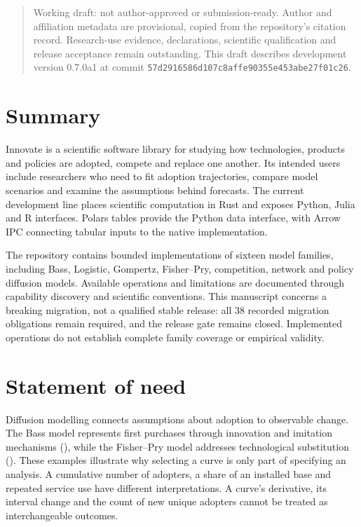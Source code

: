 \documentclass[10pt,a4paper,onecolumn]{article}
\begin{document}
\begin{quote}
Working draft: not author-approved or submission-ready. Author and
affiliation metadata are provisional, copied from the repository's
citation record. Research-use evidence, declarations, scientific
qualification and release acceptance remain outstanding. This draft
describes development version 0.7.0a1 at commit
\texttt{57d2916586d107c8affe90355e453abe27f01c26}.
\end{quote}

\section{Summary}\label{summary}

Innovate is a scientific software library for studying how technologies,
products and policies are adopted, compete and replace one another. Its
intended users include researchers who need to fit adoption
trajectories, compare model scenarios and examine the assumptions behind
forecasts. The current development line places scientific computation in
Rust and exposes Python, Julia and R interfaces. Polars tables provide
the Python data interface, with Arrow IPC connecting tabular inputs to
the native implementation.

The repository contains bounded implementations of sixteen model
families, including Bass, Logistic, Gompertz, Fisher--Pry, competition,
network and policy diffusion models. Available operations and
limitations are documented through capability discovery and scientific
conventions. This manuscript concerns a breaking migration, not a
qualified stable release: all 38 recorded migration obligations remain
required, and the release gate remains closed. Implemented operations do
not establish complete family coverage or empirical validity.

\section{Statement of need}\label{statement-of-need}

Diffusion modelling connects assumptions about adoption to observable
change. The Bass model represents first purchases through innovation and
imitation mechanisms (), while the
Fisher--Pry model addresses technological substitution
(). These examples
illustrate why selecting a curve is only part of specifying an analysis.
A cumulative number of adopters, a share of an installed base and
repeated service use have different interpretations. A curve's
derivative, its interval change and the count of new unique adopters
cannot be treated as interchangeable outcomes.
\end{document}
